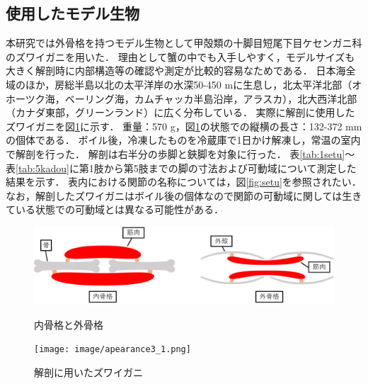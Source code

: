\subsection{使用したモデル生物}
本研究では外骨格を持つモデル生物として甲殻類の十脚目短尾下目ケセンガニ科のズワイガニを用いた．
理由として蟹の中でも入手しやすく，モデルサイズも大きく解剖時に内部構造等の確認や測定が比較的容易なためである．
日本海全域のほか，房総半島以北の太平洋岸の水深50-450 mに生息し，北太平洋北部（オホーツク海，ベーリング海，カムチャッカ半島沿岸，アラスカ），北大西洋北部（カナダ東部，グリーンランド）に広く分布している\cite{R000000004-I11140373}．
実際に解剖に使用したズワイガニを図\ref{fig:zuwai}に示す．
重量：570 g，図\ref{fig:zuwai}の状態での縦横の長さ：132-372 mmの個体である．
ボイル後，冷凍したものを冷蔵庫で1日かけ解凍し，常温の室内で解剖を行った．
解剖は右半分の歩脚と鋏脚を対象に行った．
表\ref{tab:1setu}～表\ref{tab:5kadou}に第1肢から第5肢までの脚の寸法および可動域について測定した結果を示す．
表内における関節の名称については，図\ref{fig:setu}を参照されたい．
なお，解剖したズワイガニはボイル後の個体なので関節の可動域に関しては生きている状態での可動域とは異なる可能性がある．
\begin{figure}[b]
    \begin{minipage}{0.49\hsize}
      \vspace{15mm}
      \centering
      \includegraphics[scale=0.058]{image/kokkaku.png}
      \caption{内骨格と外骨格}
      \label{fig:naigai}
    \end{minipage}
    \begin{minipage}{0.49\hsize}
      \centering
      \texttt{[image: image/apearance3\_1.png]}
      \caption{解剖に用いたズワイガニ}
      \label{fig:zuwai}
    \end{minipage}
\end{figure}
